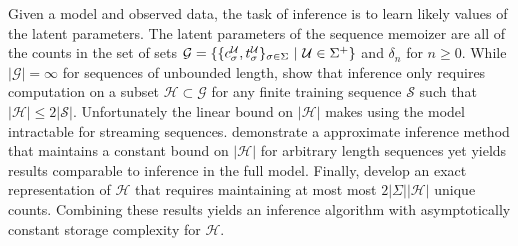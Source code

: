 
Given a model and observed data,  the task of inference is to learn likely values of the latent parameters.  The latent parameters of the sequence memoizer are all of the counts in the set of sets  $\mathcal{G} = \{ \{ c^\U_\sigma, t^\U_\sigma \}_{\sigma \in \Sigma} \ | \ \U \in \Sigma^{+} \}$  and $\delta_n$ for $n \geq 0$.  While $| \mathcal{G}| = \infty$ for sequences of unbounded length, \citep{Wood2009} show that inference only requires computation on a subset $\mathcal{H} \subset \mathcal{G}$ for any finite training sequence $\mathcal{S}$ such that $|\mathcal{H} | \leq 2 |\mathcal{S}|$.  
Unfortunately the linear bound on $|\mathcal{H}|$ makes using the model intractable for streaming sequences. \citep{Bartlett2010} demonstrate a approximate inference method that maintains a constant bound on $|\mathcal{H}| $ for arbitrary length sequences yet yields results comparable to inference in the full model.  Finally, \cite{Gasthaus2011} develop an exact representation of $\mathcal{H}$ that requires maintaining at most most $2|\Sigma| |\mathcal{H}|$ unique counts. Combining these results yields an inference algorithm with asymptotically constant storage complexity for $\mathcal{H}$.  

